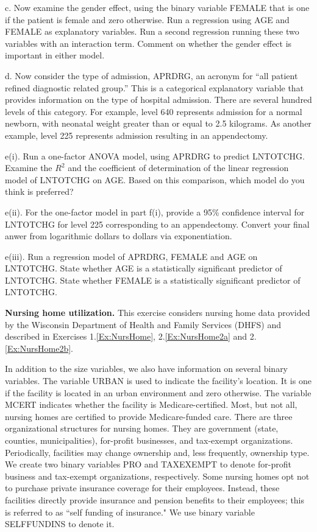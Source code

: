 \begin{exercises}
c. Now examine the gender effect, using the binary variable FEMALE
that is one if the patient is female and zero otherwise. Run a
regression using AGE and FEMALE as explanatory variables. Run a
second regression running these two variables with an interaction
term. Comment on whether the gender effect is important in either
model.

d. Now consider the type of admission, APRDRG, an acronym for ``all
patient refined diagnostic related group.'' This is a categorical
explanatory variable that provides information on the type of
hospital admission. There are several hundred levels of this
category. For example, level 640 represents admission for a normal
newborn, with neonatal weight greater than or equal to 2.5
kilograms. As another example, level 225 represents admission
resulting in an appendectomy.

e(i). Run a one-factor ANOVA model, using APRDRG to predict
LNTOTCHG. Examine the $R^2$ and the coefficient of determination of
the linear regression model of LNTOTCHG on AGE. Based on this
comparison, which model do you think is preferred?

e(ii). For the one-factor model in part f(i), provide a 95\%
confidence interval for LNTOTCHG for level 225 corresponding to an
appendectomy. Convert your final anwer from logarithmic dollars to
dollars via exponentiation.

e(iii). Run a regression model of APRDRG, FEMALE and AGE on
LNTOTCHG. State whether AGE is a statistically significant predictor
of LNTOTCHG. State whether FEMALE is a statistically significant
predictor of LNTOTCHG.


\item \textbf{Nursing home utilization.}\label{Ex:NursHome4} This exercise considers nursing
home data provided by the Wisconsin Department of Health and Family
Services (DHFS) and described in Exercises 1.\ref{Ex:NursHome},
2.\ref{Ex:NursHome2a} and 2.\ref{Ex:NursHome2b}.

In addition to the size variables, we also have information on
several binary variables. The variable URBAN is used to indicate the
facility's location. It is one if the facility is located in an
urban environment and zero otherwise. The variable MCERT indicates
whether the facility is Medicare-certified. Most, but not all,
nursing homes are certified to provide Medicare-funded care. There
are three organizational structures for nursing homes. They are
government (state, counties, municipalities), for-profit businesses,
and tax-exempt organizations. Periodically, facilities may change
ownership and, less frequently, ownership type. We create two binary
variables PRO and TAXEXEMPT to denote for-profit business and
tax-exempt organizations, respectively. Some nursing homes opt not
to purchase private insurance coverage for their employees. Instead,
these facilities directly provide insurance and pension benefits to
their employees; this is referred to as ``self funding of
insurance." We use binary variable SELFFUNDINS to denote it.


\end{exercises}
